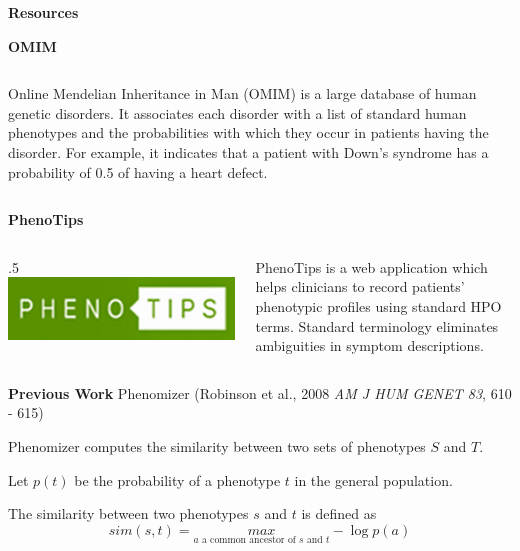 \documentclass[final]{beamer} %
\begin{document}
\begin{frame}{}
\begin{columns}[T]
\begin{column}{0.3\linewidth}
{\begin{block}{\Huge \textbf{Resources}}
\begin{block}{\Large \textbf{OMIM}}
\begin{columns}[T]
        \begin{column}{.5\textwidth}
          \Large Online Mendelian Inheritance in Man (OMIM) is a large
          database of human genetic disorders. It associates each
          disorder with a list of standard human phenotypes and the
          probabilities with which they occur in patients having the
          disorder. For example, it indicates that a patient with
          Down's syndrome has a probability of 0.5 of having a heart
          defect.
        \end{column}
      \end{columns}
    \end{block}

  

    \begin{block}{\Large \textbf{PhenoTips}}
      \begin{columns}[T]
        \begin{column} {.5\textwidth}
          \centering
          \includegraphics[width=.9\textwidth]{PhenoTips}
        \end{column}
        
        \begin{column}{.5\textwidth}
          \Large PhenoTips is a web application which helps clinicians
          to record patients' phenotypic profiles using standard HPO
          terms. Standard terminology eliminates ambiguities in
          symptom descriptions.
        \end{column}
      \end{columns}
    \end{block}
  \end{block}
  \vfill
  \begin{block}{\Huge \textbf{Previous Work}}
    \Large Phenomizer (Robinson et al., 2008 {\it{\Large AM J HUM
        GENET 83}}, 610 - 615)

    Phenomizer computes the similarity between two sets of phenotypes
    $S$ and $T$.

    Let $p(t)$ be the probability of a phenotype $t$ in the general
    population.

    The similarity between two phenotypes $s$ and $t$ is defined
    as\[sim(s,t) = \underset{a \text{ a common ancestor of $s$ and
        $t$}}{max} -\log p(a)\]


\end{block}}
\end{column}
\end{columns}
\end{frame}
\end{document}
